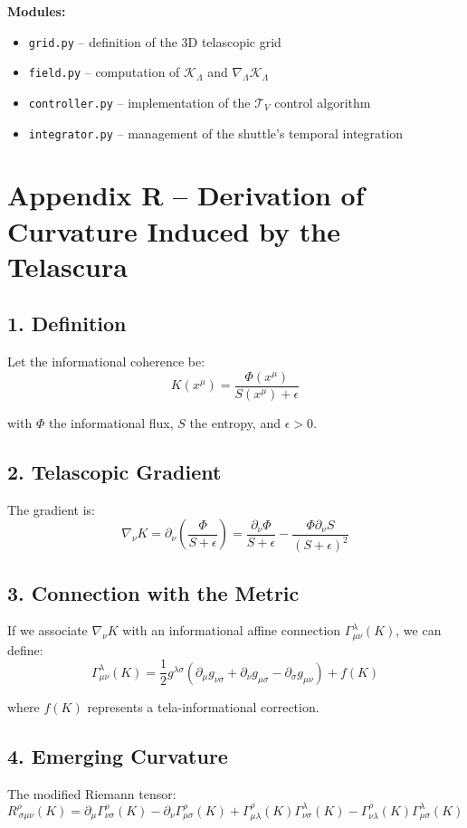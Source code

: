\documentclass[12pt]{article}
\begin{document}
\textbf{Modules:}
\begin{itemize}
  \item \texttt{grid.py} -- definition of the 3D telascopic grid
  \item \texttt{field.py} -- computation of $\mathcal{K}_\Lambda$ and $\nabla_\Lambda \mathcal{K}_\Lambda$
  \item \texttt{controller.py} -- implementation of the $\mathcal{T}_V$ control algorithm
  \item \texttt{integrator.py} -- management of the shuttle’s temporal integration
\end{itemize}

\section*{Appendix R – Derivation of Curvature Induced by the Telascura}

\subsection*{1. Definition}
Let the informational coherence be:
\[
K(x^\mu) = \frac{\Phi(x^\mu)}{S(x^\mu) + \epsilon}
\]

with $\Phi$ the informational flux, $S$ the entropy, and $\epsilon > 0$.

\subsection*{2. Telascopic Gradient}
The gradient is:
\[
\nabla_\nu K = \partial_\nu \left( \frac{\Phi}{S + \epsilon} \right) = \frac{\partial_\nu \Phi}{S + \epsilon} - \frac{\Phi \partial_\nu S}{(S + \epsilon)^2}
\]

\subsection*{3. Connection with the Metric}
If we associate $\nabla_\nu K$ with an informational affine connection $\Gamma^\lambda_{\mu\nu}(K)$, we can define:
\[
\Gamma^\lambda_{\mu\nu}(K) = \frac{1}{2} g^{\lambda\sigma} \left( \partial_\mu g_{\nu\sigma} + \partial_\nu g_{\mu\sigma} - \partial_\sigma g_{\mu\nu} \right) + f(K)
\]

where $f(K)$ represents a tela-informational correction.

\subsection*{4. Emerging Curvature}
The modified Riemann tensor:
\[
R^\rho_{\ \sigma\mu\nu}(K) = \partial_\mu \Gamma^\rho_{\nu\sigma}(K) - \partial_\nu \Gamma^\rho_{\mu\sigma}(K) + \Gamma^\rho_{\mu\lambda}(K) \Gamma^\lambda_{\nu\sigma}(K) - \Gamma^\rho_{\nu\lambda}(K) \Gamma^\lambda_{\mu\sigma}(K)
\]
\end{document}
